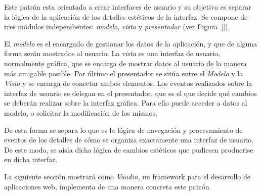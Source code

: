 
Este patrón esta orientado a crear interfaces de usuario y su objetivo es separar la lógica de la aplicación de los detalles estéticos de la interfaz. Se compone de tres módulos independientes: \emph{modelo}, \emph{vista} y \emph{presentador} (ver Figura~\ref{}).


El \emph{modelo} es el encargado de gestionar los datos de la aplicación, y que de alguna forma serán mostrados al usuario. La \emph{vista} es una interfaz de usuario, normalmente gráfica, que se encarga de mostrar datos al usuario de la manera más amigable posible. Por último el presentador se sitúa entre el \emph{Modelo} y la \emph{Vista} y se encarga de conectar ambos elementos. Los eventos realizados sobre la interfaz de usuario se delegan en el presentador, que es el que decide qué cambios se deberán realizar sobre la interfaz gráfica. Para ello puede acceder a datos al modelo, o solicitar la modificación de los mismos. 

De esta forma se separa lo que es la lógica de navegación y procesamiento de eventos de los detalles de cómo se organiza exactamente una interfaz de usuario. De este modo, se aisla dicha lógica de cambios estéticos que pudiesen producrise en dicha interfaz. 

La siguiente sección mostrará como \emph{Vaadin}, un framework para el desarrollo de aplicaciones web, implementa de una manera concreta este patrón.

 


